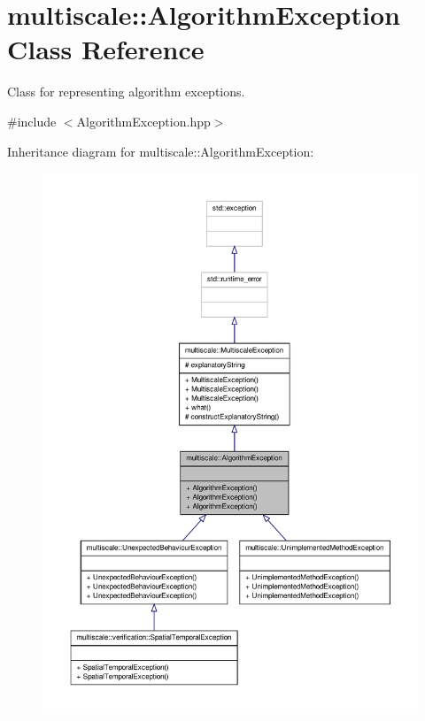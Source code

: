 \hypertarget{classmultiscale_1_1AlgorithmException}{\section{multiscale\-:\-:\-Algorithm\-Exception \-Class \-Reference}
\label{classmultiscale_1_1AlgorithmException}
}


\-Class for representing algorithm exceptions.  




{\ttfamily \#include $<$\-Algorithm\-Exception.\-hpp$>$}



\-Inheritance diagram for multiscale\-:\-:\-Algorithm\-Exception\-:
\nopagebreak
\begin{figure}[H]
\begin{center}
\leavevmode
\includegraphics[width=350pt]{classmultiscale_1_1AlgorithmException__inherit__graph}
\end{center}
\end{figure}


